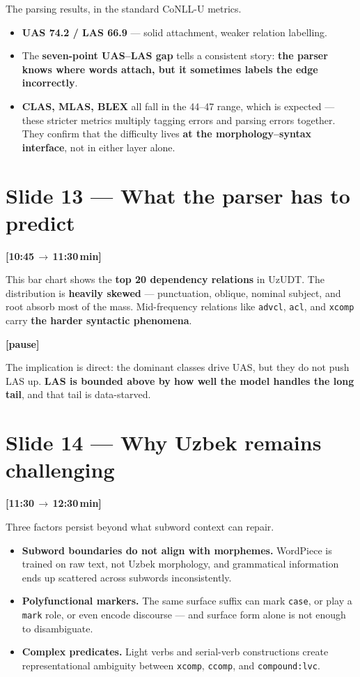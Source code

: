 \documentclass[12pt,a4paper]{article}
\newcommand{\timing}[2]{%
   \par\noindent\textbf{\small [#1\,$\to$\,#2\,min]}\par\vspace{0.2em}}
\newcommand{\say}[1]{\textbf{#1}}
\newcommand{\pause}{\par\vspace{0.4em}\textbf{[pause]}\par}
\begin{document}
The parsing results, in the standard CoNLL-U metrics.

\begin{itemize}
   \item \textbf{UAS 74.2 / LAS 66.9} --- solid attachment, weaker relation labelling.
   \item The \textbf{seven-point UAS--LAS gap} tells a consistent story: \say{the parser knows where words attach, but it sometimes labels the edge incorrectly}.
   \item \textbf{CLAS, MLAS, BLEX} all fall in the 44--47 range, which is expected --- these stricter metrics multiply tagging errors and parsing errors together. They confirm that the difficulty lives \textbf{at the morphology--syntax interface}, not in either layer alone.
\end{itemize}

\section*{Slide 13 --- What the parser has to predict}
\timing{10:45}{11:30}

This bar chart shows the \textbf{top 20 dependency relations} in UzUDT.
The distribution is \say{heavily skewed} --- punctuation, oblique,
nominal subject, and root absorb most of the mass. Mid-frequency
relations like \texttt{advcl}, \texttt{acl}, and \texttt{xcomp} carry
\textbf{the harder syntactic phenomena}.

\pause

The implication is direct: the dominant classes drive UAS, but they do
not push LAS up. \textbf{LAS is bounded above by how well the model
handles the long tail}, and that tail is data-starved.

\section*{Slide 14 --- Why Uzbek remains challenging}
\timing{11:30}{12:30}

Three factors persist beyond what subword context can repair.

\begin{itemize}
   \item \textbf{Subword boundaries do not align with morphemes.} WordPiece is trained on raw text, not Uzbek morphology, and grammatical information ends up scattered across subwords inconsistently.
   \item \textbf{Polyfunctional markers.} The same surface suffix can mark \texttt{case}, or play a \texttt{mark} role, or even encode discourse --- and surface form alone is not enough to disambiguate.
   \item \textbf{Complex predicates.} Light verbs and serial-verb constructions create representational ambiguity between \texttt{xcomp}, \texttt{ccomp}, and \texttt{compound:lvc}.
\end{itemize}
\end{document}
